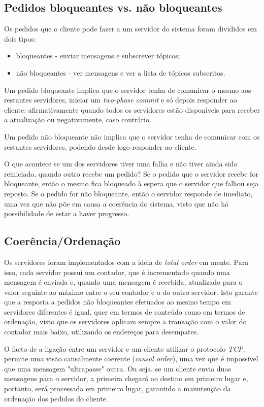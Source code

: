 \documentclass[a4paper]{report}
\begin{document}
		\subsection{Pedidos bloqueantes vs. não bloqueantes}

		Os pedidos que o cliente pode fazer a um servidor do sistema foram divididos em dois tipos: 
		\begin{itemize}
			\item bloqueantes - enviar mensagens e subscrever tópicos;
			\item não bloqueantes - ver mensagens e ver a lista de tópicos subscritos.
		\end{itemize}
		
		Um pedido bloqueante implica que o servidor tenha de comunicar o mesmo aos restantes servidores, iniciar um \textit{two-phase commit} e só depois responder ao cliente:
		afirmativamente quando todos os servidores estão disponíveis para receber a atualização ou negativamente, caso contrário.

		Um pedido não bloqueante não implica que o servidor tenha de comunicar com os restantes servidores, podendo desde logo responder ao cliente.

		O que acontece se um dos servidores tiver uma falha e não tiver ainda sido reiniciado, quando outro recebe um pedido?
		Se o pedido que o servidor recebe for bloqueante, então o mesmo fica bloqueado à espera que o servidor que falhou seja reposto.
		Se o pedido for não bloqueante, então o servidor responde de imediato, uma vez que não põe em causa a coerência do sistema, visto que não há possibilidade de estar a haver progresso.


		\subsection{Coerência/Ordenação}

		Os servidores foram implementados com a ideia de \textit{total order} em mente. Para isso, cada servidor possui um contador, que é incrementado quando uma mensagem é enviada e, quando uma mensagem é recebida, atualizado para o valor seguinte ao máximo entre o seu contador e o do outro servidor. 
		Isto garante que a resposta a pedidos não bloqueantes efetuados ao mesmo tempo em servidores diferentes é igual, quer em termos de conteúdo como em termos de ordenação, visto que os servidores aplicam sempre a transação com o valor do contador mais baixo, utilizando os endereços para desempates.

		O facto de a ligação entre um servidor e um cliente utilizar o protocolo \textit{TCP}, permite uma visão causalmente coerente (\textit{causal order}), 
		uma vez que é impossível que uma mensagem "ultrapasse" outra. Ou seja, se um cliente envia duas mensagens para o servidor, a primeira chegará ao destino em primeiro lugar e, portanto, será processada em primeiro lugar, garantido a manutenção da ordenação dos pedidos do cliente.
\end{document}

